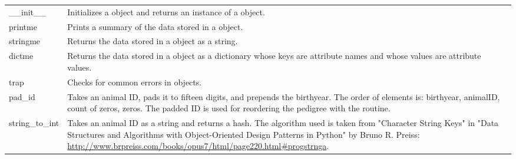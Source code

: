\begin{center}
    \tablelasttail{\hline}
    \label{tbl:objects-animal-objects-new-animal-methods}
    \begin{xtabular}{l|p{4in}}
        \_\_init\_\_ & Initializes a  object and returns an instance of a  object. \\
        printme & Prints a summary of the data stored in a  object. \\
        stringme & Returns the data stored in a  object as a string. \\
        dictme & Returns the data stored in a  object as a dictionary whose keys are attribute names and whose values are attribute values. \\
        trap & Checks for common errors in  objects. \\
        pad\_id & Takes an animal ID, pads it to fifteen digits, and prepends the birthyear. The order of elements is: birthyear, animalID, count of zeros, zeros. The padded ID is used for reordering the pedigree with the  routine. \\
        string\_to\_int & Takes an animal ID as a string and returns a hash. The algorithm used is taken from "Character String Keys" in "Data Structures and Algorithms with Object-Oriented Design Patterns in Python" by Bruno R. Preiss: \url{http://www.brpreiss.com/books/opus7/html/page220.html#progstrnga}. \\
    \end{xtabular}
\end{center}
